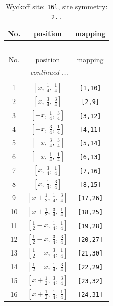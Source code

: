 \documentclass[fleqn,8pt]{jsarticle}
\begin{document}
\renewcommand{\arraystretch}{1.2}
\begin{longtable}{ccc}
\caption{Wyckoff site: {\tt 16l}, site symmetry: {\tt 2..}}
 \\
 \hline \hline
No. & position & mapping \\ \hline \endfirsthead

\multicolumn{2}{l}{\tablename\ \thetable{}} \\
 \hline \hline
No. & position & mapping \\ \hline \endhead

 \hline \hline
\multicolumn{2}{r}{\footnotesize\it continued ...} \\ \endfoot

 \hline \hline
\multicolumn{2}{r}{} \\ \endlastfoot

1 & $\left[ x,\, \frac{1}{4},\, \frac{1}{4} \right]$ & {\tt [1,10]} \\ \hline
2 & $\left[ x,\, \frac{3}{4},\, \frac{3}{4} \right]$ & {\tt [2,9]} \\ \hline
3 & $\left[ - x,\, \frac{1}{4},\, \frac{3}{4} \right]$ & {\tt [3,12]} \\ \hline
4 & $\left[ - x,\, \frac{3}{4},\, \frac{1}{4} \right]$ & {\tt [4,11]} \\ \hline
5 & $\left[ - x,\, \frac{3}{4},\, \frac{3}{4} \right]$ & {\tt [5,14]} \\ \hline
6 & $\left[ - x,\, \frac{1}{4},\, \frac{1}{4} \right]$ & {\tt [6,13]} \\ \hline
7 & $\left[ x,\, \frac{3}{4},\, \frac{1}{4} \right]$ & {\tt [7,16]} \\ \hline
8 & $\left[ x,\, \frac{1}{4},\, \frac{3}{4} \right]$ & {\tt [8,15]} \\ \hline
9 & $\left[ x + \frac{1}{2},\, \frac{1}{4},\, \frac{3}{4} \right]$ & {\tt [17,26]} \\ \hline
10 & $\left[ x + \frac{1}{2},\, \frac{3}{4},\, \frac{1}{4} \right]$ & {\tt [18,25]} \\ \hline
11 & $\left[ \frac{1}{2} - x,\, \frac{1}{4},\, \frac{1}{4} \right]$ & {\tt [19,28]} \\ \hline
12 & $\left[ \frac{1}{2} - x,\, \frac{3}{4},\, \frac{3}{4} \right]$ & {\tt [20,27]} \\ \hline
13 & $\left[ \frac{1}{2} - x,\, \frac{3}{4},\, \frac{1}{4} \right]$ & {\tt [21,30]} \\ \hline
14 & $\left[ \frac{1}{2} - x,\, \frac{1}{4},\, \frac{3}{4} \right]$ & {\tt [22,29]} \\ \hline
15 & $\left[ x + \frac{1}{2},\, \frac{3}{4},\, \frac{3}{4} \right]$ & {\tt [23,32]} \\ \hline
16 & $\left[ x + \frac{1}{2},\, \frac{1}{4},\, \frac{1}{4} \right]$ & {\tt [24,31]} \\
\end{longtable}
\end{document}
